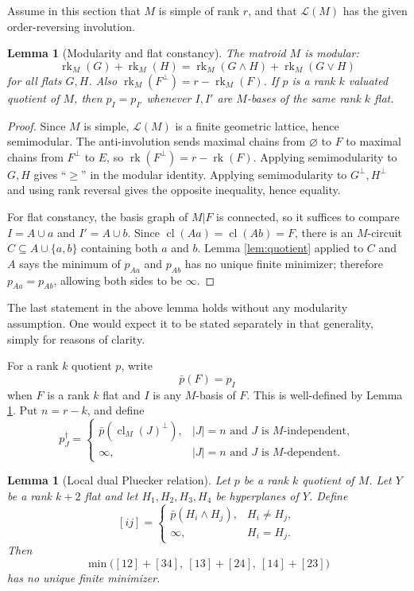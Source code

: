 \documentclass[12pt]{article}
\newtheorem{lemma}[theorem]{Lemma}
\theoremstyle{definition}
\newcommand{\rk}{\operatorname{rk}}
\newcommand{\cl}{\operatorname{cl}}
\newcommand{\cL}{\mathcal L}
\newcommand{\review}[1]{\begin{reviewbox}#1\end{reviewbox}}
\begin{document}
Assume in this section that \(M\) is simple of rank \(r\), and that \(\cL(M)\) has the given order-reversing involution.

\begin{lemma}[Modularity and flat constancy]\label{lem:modflat}
The matroid \(M\) is modular:
\[
\rk_M(G)+\rk_M(H)=\rk_M(G\wedge H)+\rk_M(G\vee H)
\]
for all flats \(G,H\).  Also \(\rk_M(F^\perp)=r-\rk_M(F)\).  If \(p\) is a rank \(k\) valuated quotient of \(M\), then \(p_I=p_{I'}\) whenever \(I,I'\) are \(M\)-bases of the same rank \(k\) flat.
\end{lemma}

\begin{proof}
Since \(M\) is simple, \(\cL(M)\) is a finite geometric lattice, hence semimodular.  The anti-involution sends maximal chains from \(\varnothing\) to \(F\) to maximal chains from \(F^\perp\) to \(E\), so \(\rk(F^\perp)=r-\rk(F)\).  Applying semimodularity to \(G,H\) gives ``\(\ge\)'' in the modular identity.  Applying semimodularity to \(G^\perp,H^\perp\) and using rank reversal gives the opposite inequality, hence equality.

For flat constancy, the basis graph of \(M|F\) is connected, so it suffices to compare \(I=A\cup a\) and \(I'=A\cup b\).  Since \(\cl(Aa)=\cl(Ab)=F\), there is an \(M\)-circuit \(C\subseteq A\cup\{a,b\}\) containing both \(a\) and \(b\).  Lemma \ref{lem:quotient} applied to \(C\) and \(A\) says the minimum of \(p_{Aa}\) and \(p_{Ab}\) has no unique finite minimizer; therefore \(p_{Aa}=p_{Ab}\), allowing both sides to be \(\infty\).
\end{proof}
\review{The last statement in the above lemma holds without any modularity assumption. One would expect it to be stated separately in that generality, simply for reasons of clarity.}

For a rank \(k\) quotient \(p\), write
\[
\bar p(F)=p_I
\]
when \(F\) is a rank \(k\) flat and \(I\) is any \(M\)-basis of \(F\).  This is well-defined by Lemma \ref{lem:modflat}.  Put \(n=r-k\), and define
\[
p^\dagger_J=
\begin{cases}
\bar p(\cl_M(J)^\perp),& |J|=n\text{ and }J\text{ is }M\text{-independent},\\
\infty,& |J|=n\text{ and }J\text{ is }M\text{-dependent}.
\end{cases}
\]

\begin{lemma}[Local dual Pluecker relation]\label{lem:local}
Let \(p\) be a rank \(k\) quotient of \(M\).  Let \(Y\) be a rank \(k+2\) flat and let \(H_1,H_2,H_3,H_4\) be hyperplanes of \(Y\).  Define
\[
[ij]=
\begin{cases}
\bar p(H_i\wedge H_j),&H_i\ne H_j,\\
\infty,&H_i=H_j.
\end{cases}
\]
Then
\[
\min\bigl([12]+[34],\ [13]+[24],\ [14]+[23]\bigr)
\]
has no unique finite minimizer.
\end{lemma}
\end{document}
